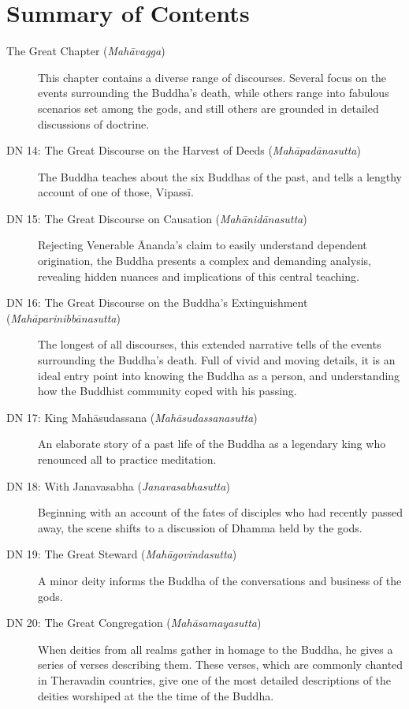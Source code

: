 \documentclass[12pt,openany]{book}%
\begin{document}
\newpage

\setlength{\parindent}{1.5em}%
\tableofcontents
\newpage
\pagestyle{fancy}
%
\chapter*{Summary of Contents}

\begin{description}%
\item[The Great Chapter (\textit{\textsanskrit{Mahāvagga}})] This chapter contains a diverse range of discourses. Several focus on the events surrounding the Buddha’s death, while others range into fabulous scenarios set among the gods, and still others are grounded in detailed discussions of doctrine.%
\item[DN 14: The Great Discourse on the Harvest of Deeds (\textit{\textsanskrit{Mahāpadānasutta}})] The Buddha teaches about the six Buddhas of the past, and tells a lengthy account of one of those, \textsanskrit{Vipassī}.%
\item[DN 15: The Great Discourse on Causation (\textit{\textsanskrit{Mahānidānasutta}})] Rejecting Venerable Ānanda’s claim to easily understand dependent origination, the Buddha presents a complex and demanding analysis, revealing hidden nuances and implications of this central teaching.%
\item[DN 16: The Great Discourse on the Buddha’s Extinguishment (\textit{\textsanskrit{Mahāparinibbānasutta}})] The longest of all discourses, this extended narrative tells of the events surrounding the Buddha’s death. Full of vivid and moving details, it is an ideal entry point into knowing the Buddha as a person, and understanding how the Buddhist community coped with his passing.%
\item[DN 17: King \textsanskrit{Mahāsudassana} (\textit{\textsanskrit{Mahāsudassanasutta}})] An elaborate story of a past life of the Buddha as a legendary king who renounced all to practice meditation.%
\item[DN 18: With Janavasabha (\textit{\textsanskrit{Janavasabhasutta}})] Beginning with an account of the fates of disciples who had recently passed away, the scene shifts to a discussion of Dhamma held by the gods.%
\item[DN 19: The Great Steward (\textit{\textsanskrit{Mahāgovindasutta}})] A minor deity informs the Buddha of the conversations and business of the gods.%
\item[DN 20: The Great Congregation (\textit{\textsanskrit{Mahāsamayasutta}})] When deities from all realms gather in homage to the Buddha, he gives a series of verses describing them. These verses, which are commonly chanted in Theravadin countries, give one of the most detailed descriptions of the deities worshiped at the the time of the Buddha.%

\end{description}
\end{document}
